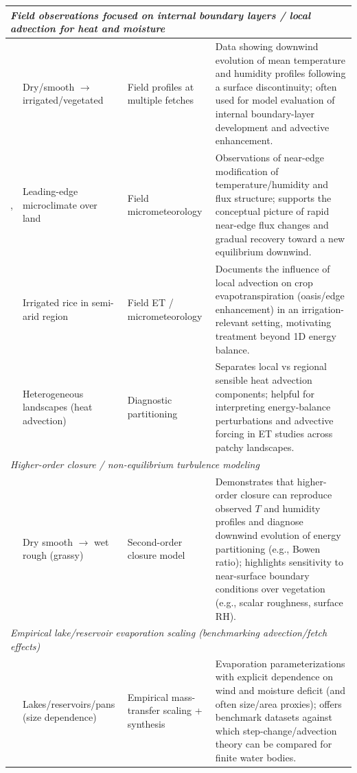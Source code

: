 \documentclass{article}
\begin{document}
\begin{table}[htbp]
\begin{tabular}{|p{2.7cm}|p{3.2cm}|p{2.9cm}|p{6.0cm}|}
    \multicolumn{4}{|l|}{\textit{Field observations focused on internal boundary layers / local advection for heat and moisture}} \\
    \hline
    \citet{rider1963horizontal}
    & Dry/smooth $\rightarrow$ irrigated/vegetated
    & Field profiles at multiple fetches
    & Data showing downwind evolution of mean temperature and humidity profiles following a surface discontinuity;
    often used for model evaluation of internal boundary-layer development and advective enhancement. \\
    \hline
    \citet{millar1964effect},
    & Leading-edge microclimate over land & Field micrometeorology & Observations of near-edge modification of temperature/humidity and flux structure; supports the conceptual picture of rapid near-edge flux changes and gradual recovery toward a new equilibrium downwind. \\
    \hline
    \citet{lang1974influence} & Irrigated rice in semi-arid region & Field ET / micrometeorology & Documents the influence of local advection on crop evapotranspiration (oasis/edge enhancement) in an irrigation-relevant setting, motivating treatment beyond 1D energy balance. \\
    \hline
    \citet{brakke1978local} & Heterogeneous landscapes (heat advection) & Diagnostic partitioning & Separates local vs regional sensible heat advection components; helpful for interpreting energy-balance perturbations and advective forcing in ET studies across patchy landscapes. \\
    \hline
    
    \multicolumn{4}{|l|}{\textit{Higher-order closure / non-equilibrium turbulence modeling}} \\
    \hline
    \citet{rao1974local} & Dry smooth $\rightarrow$ wet rough (grassy) & Second-order closure model & Demonstrates that higher-order closure can reproduce observed $T$ and humidity profiles and diagnose downwind evolution of energy partitioning (e.g., Bowen ratio); highlights sensitivity to near-surface boundary conditions over vegetation (e.g., scalar roughness, surface RH). \\
    \hline
    
    \multicolumn{4}{|l|}{\textit{Empirical lake/reservoir evaporation scaling (benchmarking advection/fetch effects)}} \\
    \hline
    \citet{ brutsaert1968mass} & Lakes/reservoirs/pans (size dependence) & Empirical mass-transfer scaling + synthesis & Evaporation parameterizations with explicit dependence on wind and moisture deficit (and often size/area proxies); offers benchmark datasets against which step-change/advection theory can be compared for finite water bodies. \\
    \hline
    \end{tabular}
    \end{table}
    
\end{document}
